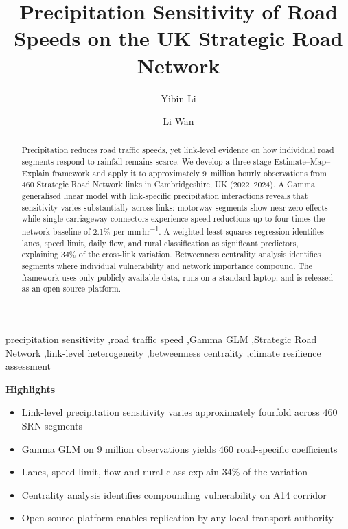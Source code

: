 \documentclass[review]{elsarticle}
\begin{document}
\begin{frontmatter}

\title{Precipitation Sensitivity of Road Speeds on the UK Strategic Road Network}

\author[cam]{Yibin Li}
\author[cam]{Li Wan}


\begin{abstract}
Precipitation reduces road traffic speeds, yet link-level evidence on how individual road segments respond to rainfall remains scarce. We develop a three-stage Estimate--Map--Explain framework and apply it to approximately 9~million hourly observations from 460 Strategic Road Network links in Cambridgeshire, UK (2022--2024). A Gamma generalised linear model with link-specific precipitation interactions reveals that sensitivity varies substantially across links: motorway segments show near-zero effects while single-carriageway connectors experience speed reductions up to four times the network baseline of 2.1\% per mm\,hr\textsuperscript{$-$1}. A weighted least squares regression identifies lanes, speed limit, daily flow, and rural classification as significant predictors, explaining 34\% of the cross-link variation. Betweenness centrality analysis identifies segments where individual vulnerability and network importance compound. The framework uses only publicly available data, runs on a standard laptop, and is released as an open-source platform.
\end{abstract}

\begin{keyword}
precipitation sensitivity \sep road traffic speed \sep Gamma GLM \sep Strategic Road Network \sep link-level heterogeneity \sep betweenness centrality \sep climate resilience assessment
\end{keyword}

\end{frontmatter}

\noindent\textbf{Highlights}
\begin{itemize}
\item Link-level precipitation sensitivity varies approximately fourfold across 460 SRN segments
\item Gamma GLM on 9 million observations yields 460 road-specific coefficients
\item Lanes, speed limit, flow and rural class explain 34\% of the variation
\item Centrality analysis identifies compounding vulnerability on A14 corridor
\item Open-source platform enables replication by any local transport authority
\end{itemize}
\end{document}
